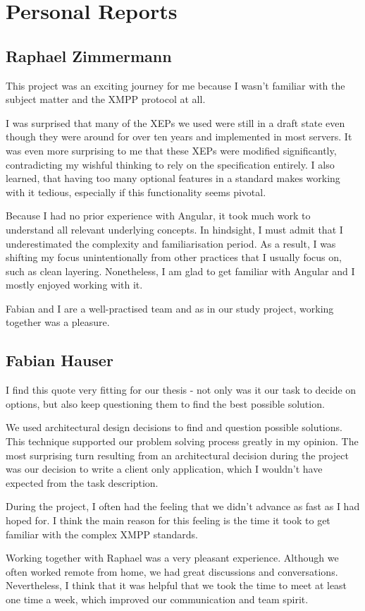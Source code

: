 \section{Personal Reports}\label{sec:personal-reports}

\subsection{Raphael Zimmermann}

This project was an exciting journey for me because I wasn't familiar with the subject matter and the XMPP protocol at all.

I was surprised that many of the XEPs we used were still in a draft state even though they were around for over ten years and implemented in most servers.
It was even more surprising to me that these XEPs were modified significantly, contradicting my wishful thinking to rely on the specification entirely.
I also learned, that having too many optional features in a standard makes working with it tedious, especially if this functionality seems pivotal.

Because I had no prior experience with Angular, it took much work to understand all relevant underlying concepts.
In hindsight, I must admit that I underestimated the complexity and familiarisation period.
As a result, I was shifting my focus unintentionally from other practices that I usually focus on, such as clean layering.
Nonetheless, I am glad to get familiar with Angular and I mostly enjoyed working with it.

Fabian and I are a well-practised team and as in our study project, working together was a pleasure.

\subsection{Fabian Hauser}

%
I find this quote very fitting for our thesis - not only was it our task to decide on options,
but also keep questioning them to find the best possible solution.

We used architectural design decisions to find and question possible solutions.
This technique supported our problem solving process greatly in my opinion.
The most surprising turn resulting from an architectural decision during the project was our decision to write a client only application,
which I wouldn't have expected from the task description.

During the project, I often had the feeling that we didn't advance as fast as I had hoped for.
I think the main reason for this feeling is the time it took to get familiar with the complex XMPP standards.

Working together with Raphael was a very pleasant experience.
Although we often worked remote from home, we had great discussions and conversations.
Nevertheless, I think that it was helpful that we took the time to meet at least one time a week, which improved our communication and team spirit.